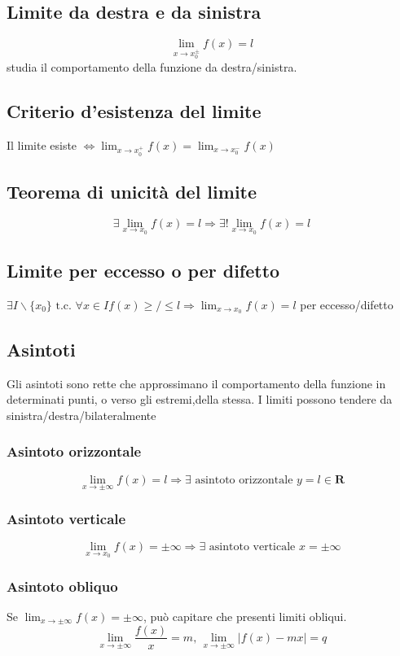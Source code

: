 \documentclass{report}
\begin{document}
    \subsection{Limite da destra e da sinistra}
        $$\lim_{x \to x_0^{\pm}} f\left(x\right) = l$$ studia il comportamento
        della funzione da destra/sinistra.
    \subsection{Criterio d'esistenza del limite}
        Il limite esiste $
            \Longleftrightarrow \lim_{x \to x_0^+} f\left(x\right) = \lim_{x \to x_0^-} f\left(x\right)
        $
    \subsection{Teorema di unicità del limite}
        $$\exists \lim_{x \to x_0} f\left(x\right) = l \Longrightarrow \exists! \lim_{x \to x_0} f\left(x\right) = l$$
    \subsection{Limite per eccesso o per difetto}
        $\exists I\backslash\{x_0\} \textrm{ t.c. } \forall x \in I f\left(x\right) \geq/\leq l \Longrightarrow 
            \lim_{x \to x_0} f\left(x\right) = l$ per eccesso/difetto 
    \subsection{Asintoti}
        Gli asintoti sono rette che approssimano il comportamento della funzione in determinati punti, o verso gli estremi,della stessa.
        I limiti possono tendere da sinistra/destra/bilateralmente
        \subsubsection{Asintoto orizzontale}
            $$\lim_{x \to \pm \infty} f\left(x\right) = l \Longrightarrow \exists \textrm{ asintoto orizzontale } y = l \in \mathbf{R}$$
        \subsubsection{Asintoto verticale}
            $$\lim_{x \to x_0} f\left(x\right) = \pm \infty \Longrightarrow \exists \textrm{ asintoto verticale } x = \pm \infty$$
        \subsubsection{Asintoto obliquo}
            Se $\lim_{x \to \pm \infty} f\left(x\right) = \pm \infty$,   può capitare che presenti limiti obliqui.
            $$\lim_{x \to \pm \infty} \frac{f\left(x\right)}{x} = m, \, \lim_{x \to \pm \infty} |f\left(x\right) - mx| = q$$
\end{document}
